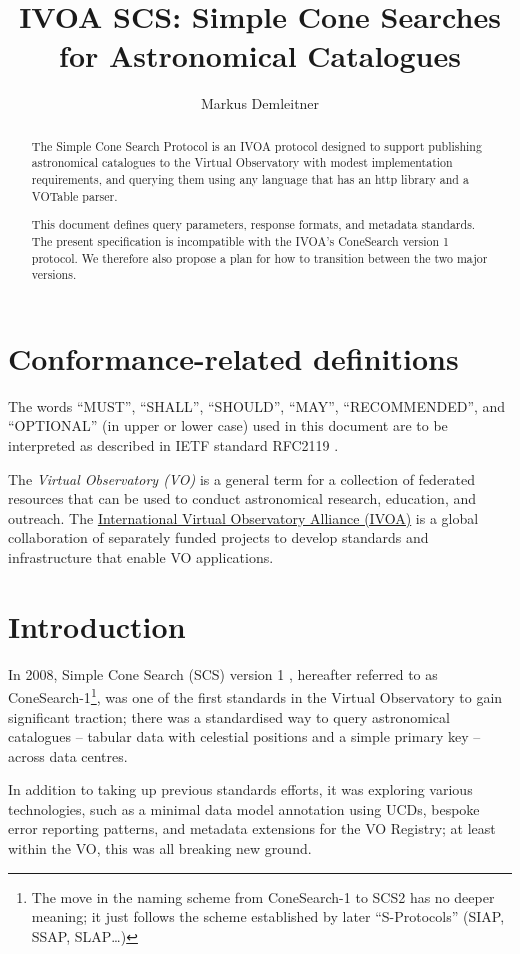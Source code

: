 \documentclass[11pt,a4paper]{ivoa}
\title{IVOA SCS: Simple Cone Searches for Astronomical Catalogues}
\author[https://wiki.ivoa.net/twiki/bin/view/IVOA/MarkusDemleitner]{
  Markus Demleitner}
\begin{document}
\begin{abstract}
The Simple Cone Search Protocol is an IVOA protocol designed to support
publishing astronomical catalogues to the Virtual Observatory with
modest implementation requirements, and querying them using any language
that has an http library and a VOTable parser.

This document defines query parameters, response formats, and metadata
standards.  The present specification is incompatible with the IVOA's
ConeSearch version 1 protocol.  We therefore also propose a plan for how
to transition between the two major versions.

\end{abstract}


\section*{Conformance-related definitions}

The words ``MUST'', ``SHALL'', ``SHOULD'', ``MAY'', ``RECOMMENDED'', and
``OPTIONAL'' (in upper or lower case) used in this document are to be
interpreted as described in IETF standard RFC2119 \citep{std:RFC2119}.

The \emph{Virtual Observatory (VO)} is a
general term for a collection of federated resources that can be used
to conduct astronomical research, education, and outreach.
The \href{https://www.ivoa.net}{International
Virtual Observatory Alliance (IVOA)} is a global
collaboration of separately funded projects to develop standards and
infrastructure that enable VO applications.


\section{Introduction}

In 2008, Simple Cone Search (SCS) version 1 \citep{2008ivoa.specQ0222P},
hereafter referred to as ConeSearch-1\footnote{The move in the naming
scheme from ConeSearch-1 to SCS2 has no deeper meaning; it just follows
the scheme established by later ``S-Protocols'' (SIAP, SSAP, SLAP\dots)},
was one of the first standards in the Virtual Observatory to gain
significant traction; there was a standardised way to query astronomical
catalogues -- tabular data with celestial positions and a simple primary
key -- across data centres.

In addition to taking up previous standards efforts, it was exploring
various technologies, such as a minimal data model annotation using UCDs,
bespoke error reporting patterns, and metadata extensions for the VO
Registry; at least within the VO, this was all breaking new ground.
\end{document}
